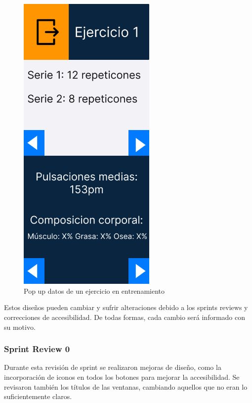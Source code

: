 \begin{figure}[H]
   \centering
    \includegraphics[width=0.6\textwidth]{fotos/Frame 35.png}
    \caption{Pop up datos de un ejercicio en entrenamiento}
    \label{fig:Pop up datos de un ejercicio en entrenamiento}
\end{figure}


Estos diseños pueden cambiar y sufrir alteraciones debido a los sprints reviews y correcciones de accesibilidad. De todas formas, cada cambio será informado con su motivo.

\subsubsection{Sprint Review 0}
Durante esta revisi\'on de sprint se realizaron mejoras de dise\~no, como la incorporaci\'on de iconos en todos los botones para mejorar la accesibilidad. Se revisaron también los t\'itulos de las ventanas, cambiando aquellos que no eran lo suficientemente claros.

